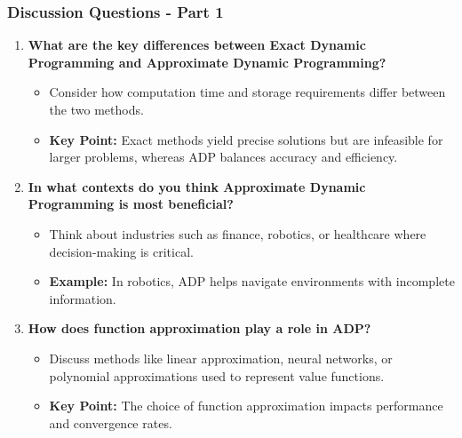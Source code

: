 \documentclass[aspectratio=169]{beamer}
\begin{document}
\begin{frame}[fragile]
    \frametitle{Discussion Questions - Part 1}
    \begin{enumerate}
        \item \textbf{What are the key differences between Exact Dynamic Programming and Approximate Dynamic Programming?}
        \begin{itemize}
            \item Consider how computation time and storage requirements differ between the two methods.
            \item \textbf{Key Point:} Exact methods yield precise solutions but are infeasible for larger problems, whereas ADP balances accuracy and efficiency.
        \end{itemize}

        \item \textbf{In what contexts do you think Approximate Dynamic Programming is most beneficial?}
        \begin{itemize}
            \item Think about industries such as finance, robotics, or healthcare where decision-making is critical.
            \item \textbf{Example:} In robotics, ADP helps navigate environments with incomplete information.
        \end{itemize}

        \item \textbf{How does function approximation play a role in ADP?}
        \begin{itemize}
            \item Discuss methods like linear approximation, neural networks, or polynomial approximations used to represent value functions.
            \item \textbf{Key Point:} The choice of function approximation impacts performance and convergence rates.
        \end{itemize}
    \end{enumerate}
\end{frame}
\end{document}
